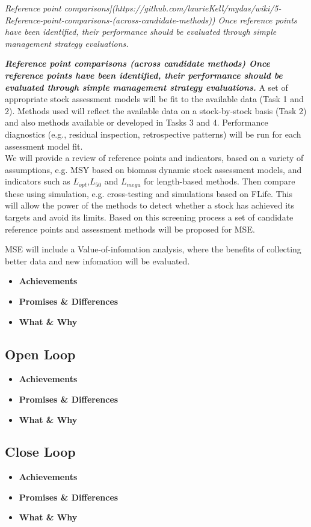
\textit{Reference point comparisons](https://github.com/laurieKell/mydas/wiki/5-Reference-point-comparisons-(across-candidate-methods)) Once reference points have been identified, their performance should be evaluated through simple management strategy evaluations.}

\textit{\textbf{Reference point comparisons (across candidate methods) Once reference points have been identified, their performance should be evaluated through simple management strategy evaluations.}}
A set of appropriate stock assessment models will be fit to the available data (Task 1 and 2). Methods used will reflect the available data on a stock-by-stock basis (Task 2) and also methods available or developed in Tasks 3 and 4. Performance diagnostics (e.g., residual inspection, retrospective patterns) will be run for each assessment model fit.\\
We will provide a review of reference points and indicators, based on a variety of assumptions, e.g. MSY based on biomass dynamic stock assessment models, and indicators such as $L_{opt}$,$L_{50}$ and $L_{mega}$ for length-based methods. Then compare these using simulation, e.g. cross-testing and simulations based on FLife. This will allow the power of the methods to detect whether a stock has achieved its targets and avoid its limits. Based on this screening process a set of candidate reference points and assessment methods will be proposed for MSE.

MSE will include a Value-of-infomation analysis, where the benefits of collecting better data and new infomation will be evaluated.

\begin{itemize}[labelindent=\parindent,noitemsep,topsep=0pt,parsep=0pt,partopsep=0pt]
 \item \textbf{Achievements}
 \item \textbf{Promises \& Differences}
 \item \textbf{What \& Why}
\end{itemize}

\subsection{Open Loop}
\begin{itemize}[labelindent=\parindent,noitemsep,topsep=0pt,parsep=0pt,partopsep=0pt]
 \item \textbf{Achievements}
 \item \textbf{Promises \& Differences}
 \item \textbf{What \& Why}
\end{itemize}

\subsection{Close Loop}
\begin{itemize}[labelindent=\parindent,noitemsep,topsep=0pt,parsep=0pt,partopsep=0pt]
 \item \textbf{Achievements}
 \item \textbf{Promises \& Differences}
 \item \textbf{What \& Why}
\end{itemize}


